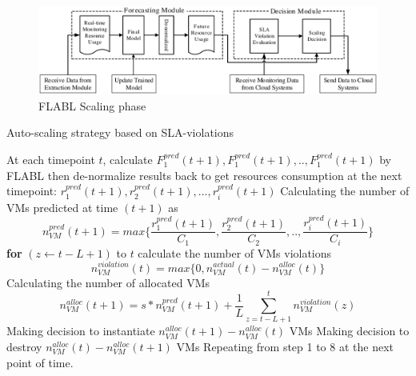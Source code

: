 \documentclass[runningheads]{llncs}
\begin{document}
\begin{figure}
	\begin{center}
		\includegraphics[width=1.0\textwidth]{images/pdf/Forecasting_Module.eps}
		\caption{FLABL Scaling phase}
		\label{FLABLscaling}
	\end{center}
\end{figure}


\begin{algorithm}[thb]
	\caption{Auto-scaling strategy based on SLA-violations}\label{algo_auto_scaling}
	\begin{algorithmic}[1]
		\State At each timepoint $t$, calculate 
			$F^{pred}_{1}(t+1), F^{pred}_{1}(t+1), .., F^{pred}_{1}(t+1)$ by FLABL 
			\Statex then de-normalize results back to get resources consumption at the next timepoint:
			$r^{pred}_{1}(t+1), r^{pred}_{2}(t+1), ..., r^{pred}_{i}(t+1)$
		\State Calculating the number of VMs predicted at time $(t+1)$ as 
			\begin{equation} \label{eq_vm_predictions}
				n^{pred}_{VM} (t+1)  = 
				max \Big\{ \frac{ r^{pred}_{1}(t+1) }{ C_1 }, \frac{ r^{pred}_{2}(t+1) }{ C_2 },.., \frac{ r^{pred}_{i}(t+1) }{ C_i } \Big\}
			\end{equation}	
		\State \textbf{for} $(z \gets t-L+1)$ to $t$ calculate the number of VMs violations  
			\begin{equation}\label{eq_vm_violations}
				n^{violation}_{VM} (t) = max \big\{  0, n^{actual}_{VM} (t) - n^{alloc}_{VM} (t)  \Big\}
			\end{equation}
		\State Calculating the number of allocated VMs 
			\begin{equation}\label{eq_vm_allocated}
				n^{alloc}_{VM} (t+1) = s * n^{pred}_{VM} (t+1) + \frac{1}{L} \displaystyle\sum_{z=t-L+1}^t n^{violation}_{VM} (z)
			\end{equation}
			\State Making decision to instantiate $ n^{alloc}_{VM} (t+1) - n^{alloc}_{VM} (t) $ VMs
		\Else
			\State Making decision to destroy $ n^{alloc}_{VM} (t) - n^{alloc}_{VM} (t+1) $ VMs
		\EndIf
		\State Repeating from step 1 to 8 at the next point of time.
	\end{algorithmic}
\end{algorithm}
\end{document}

